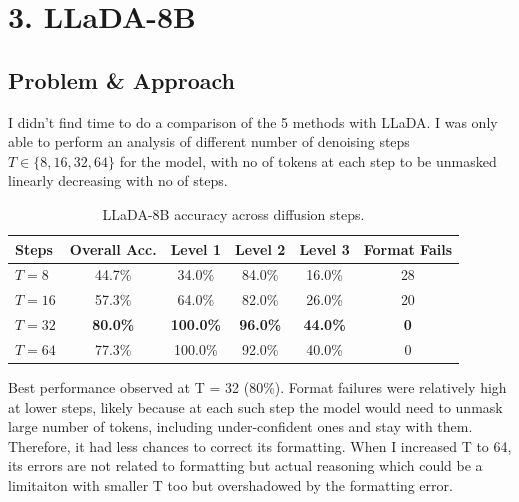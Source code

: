 \section*{3. LLaDA-8B}

\subsection*{Problem \& Approach}
I didn't find time to do a comparison of the 5 methods with LLaDA. I was only able to perform an analysis of different number of denoising steps $T \in \{8, 16, 32, 64\}$ for the model, with no of tokens at each step to be unmasked linearly decreasing with no of steps.

\begin{table}[h]
\centering
\begin{tabular}{l c c c c c}
\toprule
\textbf{Steps} & \textbf{Overall Acc.} & \textbf{Level 1} & \textbf{Level 2} & \textbf{Level 3} & \textbf{Format Fails} \\
\midrule
$T = 8$  & 44.7\%  & 34.0\%  & 84.0\%  & 16.0\%  & 28 \\
$T = 16$ & 57.3\%  & 64.0\%  & 82.0\%  & 26.0\%  & 20 \\
$T = 32$ & \textbf{80.0\%} & \textbf{100.0\%} & \textbf{96.0\%}  & \textbf{44.0\%}  & \textbf{0} \\
$T = 64$ & 77.3\% & 100.0\% & 92.0\%  & 40.0\%  & 0 \\
\bottomrule
\end{tabular}
\caption{LLaDA-8B accuracy across diffusion steps.}
\label{tab:llada_results}
\end{table}



Best performance observed at T = 32 (80\%). Format failures were relatively high at lower steps, likely because at each such step the model would need to unmask large number of tokens, including under-confident ones and stay with them. Therefore, it had less chances to correct its formatting. When I increased T to 64, its errors are not related to formatting but actual reasoning which could be a limitaiton with smaller T too but overshadowed by the formatting error.\\ \\

